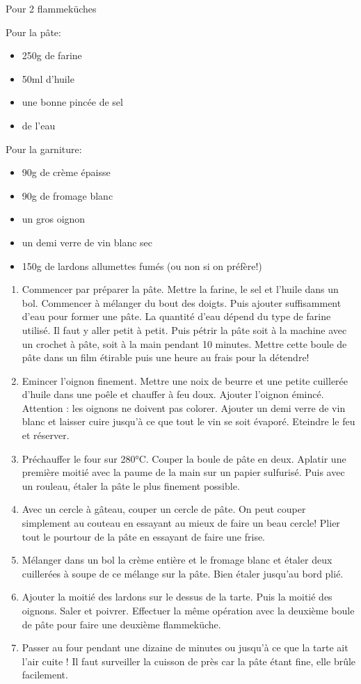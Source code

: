 \bigskip
{}
{Pour 2 flammeküches}{
 Pour la pâte:
\begin{itemize}
  \item 250g de farine
  \item 50ml d'huile
  \item une bonne pincée de sel
  \item de l'eau
\end{itemize}
Pour la garniture:
\begin{itemize}
  \item 90g de crème épaisse
  \item 90g de fromage blanc
  \item un gros oignon
  \item un demi verre de vin blanc sec
  \item 150g de lardons allumettes fumés (ou non si on préfère!)
\end{itemize}}
{\begin{enumerate}
	\item Commencer par préparer la pâte. Mettre la farine, le sel et l'huile dans un bol. Commencer à mélanger du bout des doigts. Puis ajouter suffisamment d'eau pour former une pâte. La quantité d'eau dépend du type de farine utilisé. Il faut y aller petit à petit. Puis pétrir la pâte soit à la machine avec un crochet à pâte, soit à la main pendant 10 minutes. Mettre cette boule de pâte dans un film étirable puis une heure au frais pour la détendre!
	\item Emincer l'oignon finement. Mettre une noix de beurre et une petite cuillerée d'huile dans une poêle et chauffer à feu doux. Ajouter l'oignon émincé. Attention : les oignons ne doivent pas colorer. Ajouter un demi verre de vin blanc et laisser cuire jusqu'à ce que tout le vin se soit évaporé. Eteindre le feu et réserver.
	\item Préchauffer le four sur 280°C. Couper la boule de pâte en deux. Aplatir une première moitié avec la paume de la main sur un papier sulfurisé. Puis avec un rouleau, étaler la pâte le plus finement possible.
	\item Avec un cercle à gâteau, couper un cercle de pâte. On peut couper simplement au couteau en essayant au mieux de faire un beau cercle! Plier tout le pourtour de la pâte en essayant de faire une frise. 
	\item Mélanger dans un bol la crème entière et le fromage blanc et étaler deux cuillerées à soupe de ce mélange sur la pâte. Bien étaler jusqu'au bord plié.
	\item Ajouter la moitié des lardons sur le dessus de la tarte. Puis la moitié des oignons. Saler et poivrer. Effectuer la même opération avec la deuxième boule de pâte pour faire une deuxième flammeküche.
	\item Passer au four pendant une dizaine de minutes ou jusqu'à ce que la tarte ait l'air cuite ! Il faut surveiller la cuisson de près car la pâte étant fine, elle brûle facilement.
\end{enumerate}
}
